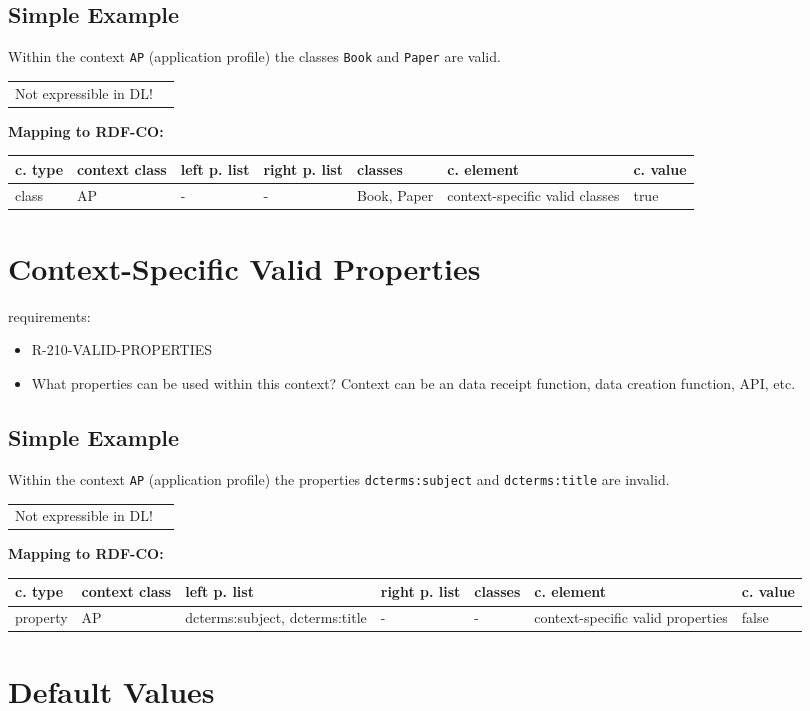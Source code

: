\documentclass{llncs}
\newcommand{\ms}[1]{\texttt{#1}}
\newenvironment{gcotable}{
  \scriptsize
  \sffamily
  \vspace{0cm}
	\begin{center}
	\textbf{\vspace{0.4cm}Mapping to RDF-CO:} \\
  \begin{tabular}{l|l|l|l|l|l|l}
	\hline
  \textbf{c. type} & \textbf{context class} & \textbf{left p. list} & \textbf{right p. list} & \textbf{classes} & \textbf{c. element} & \textbf{c. value} \\
  \hline

}{
  \hline
  \end{tabular}
	\end{center}
}
\newenvironment{DL}{
  \vspace{0cm}
	\begin{center}
  \begin{tabular}{r l}

}{
  \end{tabular}
	\end{center}
}
\begin{document}
\subsection{Simple Example}

Within the context \ms{AP} (application profile) the classes \ms{Book} and \ms{Paper} are valid.

\begin{DL}
Not expressible in DL!
\end{DL}

\begin{gcotable}
class & AP & - & - & Book, Paper & context-specific valid classes & true \\
\end{gcotable}

\section{Context-Specific Valid Properties}

requirements:

\begin{itemize}
	\item R-210-VALID-PROPERTIES
\end{itemize}

\begin{itemize}
	\item What properties can be used within this context? Context can be an data receipt function, data creation function, API, etc.
\end{itemize}

\subsection{Simple Example}

Within the context \ms{AP} (application profile) the properties \ms{dcterms:subject} and \ms{dcterms:title} are invalid.

\begin{DL}
Not expressible in DL!
\end{DL}

\begin{gcotable}
property & AP & dcterms:subject, dcterms:title & - & - & context-specific valid properties & false \\
\end{gcotable}

\section{Default Values}
\end{document}
